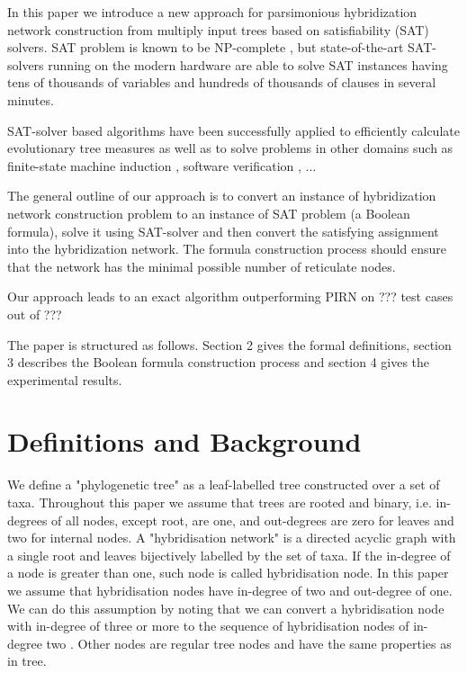 \documentclass[runningheads, envcountsame, a4paper]{llncs}
\begin{document}
In this paper we introduce a new approach for parsimonious
hybridization network construction from multiply input trees based on satisfiability (SAT) solvers.
SAT problem is known to be NP-complete \cite{bordewich2007computing}, but state-of-the-art SAT-solvers running on the modern hardware 
are able to solve SAT instances having tens of thousands of variables and hundreds of thousands of clauses in several minutes.

SAT-solver based algorithms have been successfully applied to efficiently calculate evolutionary tree measures \cite{bonet2009efficiently}
as well as to solve problems in other domains such as
finite-state machine induction \cite{heule2010exact}, software verification \cite{}, ...

The general outline of our approach is to convert an instance of hybridization network construction 
problem to an instance of SAT problem (a Boolean formula), solve it using SAT-solver and then convert 
the satisfying assignment into the hybridization network. The formula construction process should ensure that
the network has the minimal possible number of reticulate nodes.

Our approach leads to an exact algorithm outperforming PIRN on ??? test cases out of ???

The paper is structured as follows. Section 2 gives the formal definitions, section 3 describes the Boolean formula
construction process and section 4 gives the experimental results.

\section{Definitions and Background}

We define a "phylogenetic tree" as a leaf-labelled tree constructed over a set of taxa. 
Throughout this paper we assume that trees are rooted and binary, i.e. in-degrees of all nodes, except root, are one, 
and out-degrees are zero for leaves and two for internal nodes. A "hybridisation network" is a directed acyclic graph 
with a single root and leaves bijectively labelled by the set of taxa. If the in-degree of a node is greater than one, 
such node is called hybridisation node. In this paper we assume that hybridisation nodes have in-degree of two and 
out-degree of one. We can do this assumption by noting that we can convert a hybridisation node with in-degree 
of three or more to the sequence of hybridisation nodes of in-degree two \cite{wu2010close}. Other nodes are regular 
tree nodes and have the same properties as in tree.
\end{document}
